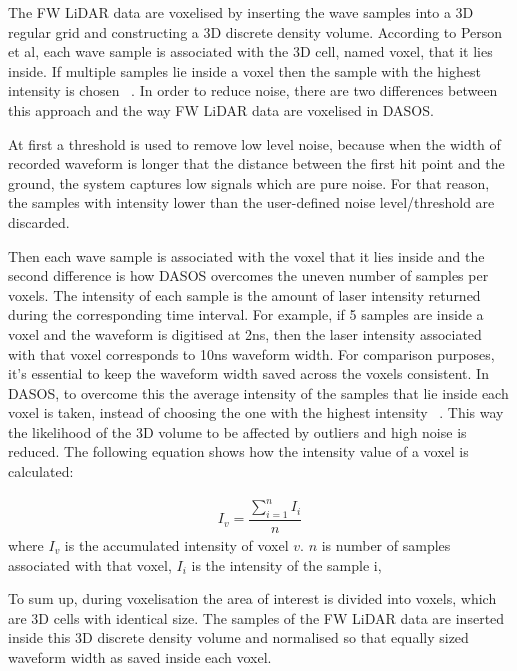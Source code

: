 \documentclass{subfiles}
\begin{document}
\par The FW LiDAR data are voxelised by inserting the wave samples into a 3D regular grid and constructing a 3D discrete density volume. According to Person et al, each wave sample is associated with the 3D cell, named voxel, that it lies inside. If multiple samples lie inside a voxel then the sample with the highest intensity is chosen ~\cite{Persson2005}. In order to reduce noise, there are two differences between this approach and the way FW LiDAR data are voxelised in DASOS. 

\par At first a threshold is used to remove low level noise, because when the width of recorded waveform is longer that the distance between the first hit point and the ground, the system captures low signals which are pure noise. For that reason, the samples with intensity lower than the user-defined noise level/threshold are discarded. 

\par Then each wave sample is associated with the voxel that it lies inside and the second difference is how DASOS overcomes the uneven number of samples per voxels. The intensity of each sample is the amount of laser intensity returned during the corresponding time interval. For example, if 5 samples are inside a voxel and the waveform is digitised at 2ns, then the laser intensity associated with that voxel corresponds to 10ns waveform width. For comparison purposes, it's essential to keep the waveform width saved across the voxels consistent. In DASOS, to overcome this the average intensity of the samples that lie inside each voxel is taken, instead of choosing the one with the highest intensity ~\cite{Persson2005}. This way the likelihood of the 3D volume to be affected by outliers and high noise is reduced. The following equation shows how the intensity value of a voxel is calculated:
 
	\begin{eqnarray}
	I_{v} = \dfrac{\sum_{i=1}^{n}I_{i}}{n}
	\end{eqnarray} 
	where 		$I_{v}$ is the accumulated intensity of voxel $v$. 
	$n$ is number of samples associated with that voxel, 
	$I_{i}$ is the intensity of the sample i, 

To sum up, during voxelisation the area of interest is divided into voxels, which are 3D cells with identical size. The samples of the FW LiDAR data are inserted inside this 3D discrete density volume and normalised so that equally sized waveform width as saved inside each voxel. 
\end{document}
